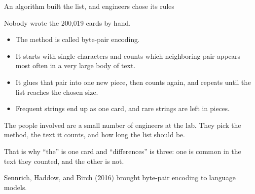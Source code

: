 \documentclass[aspectratio=169,11pt]{beamer}
\begin{document}
\begin{frame}{An algorithm built the list, and engineers chose its rules}

Nobody wrote the 200,019 cards by hand.

\vspace{0.1cm}

\begin{itemize}\setlength\itemsep{0.15em}
    \item The method is called byte-pair encoding.
    \item It starts with single characters and counts which neighboring pair appears most often in a very large body of text.
    \item It glues that pair into one new piece, then counts again, and repeats until the list reaches the chosen size.
    \item Frequent strings end up as one card, and rare strings are left in pieces.
\end{itemize}

\vspace{0.05cm}

The people involved are a small number of engineers at the lab. They pick the method, the text it counts, and how long the list should be.

\vspace{0.05cm}

\alert{That is why ``the'' is one card and ``differences'' is three: one is common in the text they counted, and the other is not.}

\vspace{0.05cm}
{\scriptsize\color{warmgray}Sennrich, Haddow, and Birch (2016) brought byte-pair encoding to language models.}

\end{frame}
\end{document}
